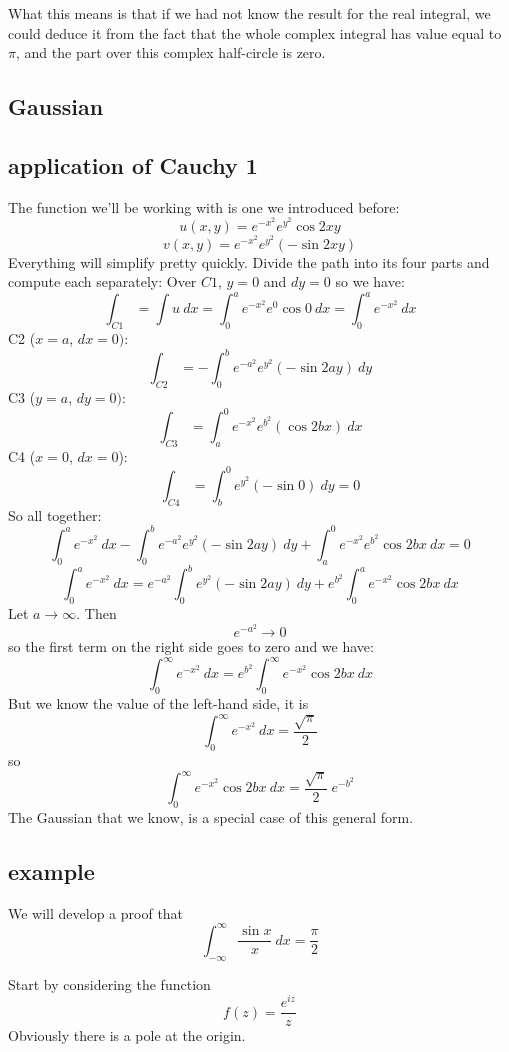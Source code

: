 \documentclass[11pt, oneside]{article}
\begin{document}
What this means is that if we had not know the result for the real integral, we could deduce it from the fact that the whole complex integral has value equal to $\pi$, and the part over this complex half-circle is zero.

\subsection*{Gaussian}

\subsection*{application of Cauchy 1}

The function we'll be working with is one we introduced before:
\[ u(x,y) =  e^{-x^2} e^{y^2} \cos 2xy \]
\[ v(x,y) = e^{-x^2} e^{y^2} (- \sin 2xy) \]
Everything will simplify pretty quickly.  Divide the path into its four parts and compute each separately:
Over $C1$, $y=0$ and $dy = 0$ so we have:
\[ \int_{C1} = \int u \ dx = \int_0^a e^{-x^2} e^{0} \cos 0 \ dx = \int_0^a e^{-x^2} \ dx \]
C2 ($x = a$, $dx = 0)$:
\[ \int_{C2} = - \int_0^b e^{-a^2} e^{y^2} (- \sin 2ay) \ dy  \]
C3 ($y = a$, $dy = 0)$:
\[ \int_{C3} = \int_a^0 e^{-x^2} e^{b^2} (\cos 2bx) \ dx  \]
C4 ($x = 0$, $dx = 0$):
\[ \int_{C4} = \int_b^0 e^{y^2} (-\sin 0) \ dy = 0 \]
So all together:
\[ \int_0^a e^{-x^2} \ dx - \int_0^b e^{-a^2} e^{y^2} (- \sin 2ay) \ dy + \int_a^0 e^{-x^2} e^{b^2} \cos 2bx \ dx = 0 \]
\[ \int_0^a e^{-x^2} \ dx = e^{-a^2} \int_0^b e^{y^2} (- \sin 2ay) \ dy + e^{b^2} \int_0^a e^{-x^2} \cos 2bx \ dx  \]
Let $a \rightarrow \infty$.  Then
\[ e^{-a^2} \rightarrow 0 \]
so the first term on the right side goes to zero and we have:
\[ \int_0^{\infty} e^{-x^2} \ dx = e^{b^2} \int_0^{\infty} e^{-x^2} \cos 2bx \ dx  \]
But we know the value of the left-hand side, it is 
\[ \int_0^{\infty} e^{-x^2} \ dx = \frac{\sqrt{\pi}}{2} \]
so
\[  \int_0^{\infty} e^{-x^2} \cos 2bx \ dx = \frac{\sqrt{\pi}}{2} \ e^{-b^2} \]
The Gaussian that we know, is a special case of this general form.

\subsection*{example}
We will develop a proof that
\[ \int_{-\infty}^{\infty} \frac{\sin x}{x} \ dx = \frac{\pi}{2} \]

Start by considering the function 
\[ f(z) = \frac{e^{iz}}{z} \]
Obviously there is a pole at the origin.
\end{document}
